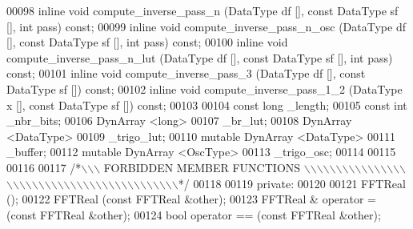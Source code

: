 \begin{DoxyCode}
00098     \textcolor{keyword}{inline} \textcolor{keywordtype}{void}     compute\_inverse\_pass\_n (DataType df [], \textcolor{keyword}{const} DataType sf [], \textcolor{keywordtype}{int} pass) \textcolor{keyword}{const};
00099     \textcolor{keyword}{inline} \textcolor{keywordtype}{void}     compute\_inverse\_pass\_n\_osc (DataType df [], \textcolor{keyword}{const} DataType sf [], \textcolor{keywordtype}{int} pass) \textcolor{keyword}{const};
00100     \textcolor{keyword}{inline} \textcolor{keywordtype}{void}     compute\_inverse\_pass\_n\_lut (DataType df [], \textcolor{keyword}{const} DataType sf [], \textcolor{keywordtype}{int} pass) \textcolor{keyword}{const};
00101     \textcolor{keyword}{inline} \textcolor{keywordtype}{void}     compute\_inverse\_pass\_3 (DataType df [], \textcolor{keyword}{const} DataType sf []) \textcolor{keyword}{const};
00102     \textcolor{keyword}{inline} \textcolor{keywordtype}{void}     compute\_inverse\_pass\_1\_2 (DataType x [], \textcolor{keyword}{const} DataType sf []) \textcolor{keyword}{const};
00103 
00104     \textcolor{keyword}{const} \textcolor{keywordtype}{long}      \_length;
00105     \textcolor{keyword}{const} \textcolor{keywordtype}{int}       \_nbr\_bits;
00106     DynArray <long>
00107                         \_br\_lut;
00108     DynArray <DataType>
00109                         \_trigo\_lut;
00110     \textcolor{keyword}{mutable} DynArray <DataType>
00111                         \_buffer;
00112    \textcolor{keyword}{mutable} DynArray <OscType>
00113                         \_trigo\_osc;
00114 
00115 
00116 
00117 \textcolor{comment}{/*\(\backslash\)\(\backslash\)\(\backslash\) FORBIDDEN MEMBER FUNCTIONS \(\backslash\)\(\backslash\)\(\backslash\)\(\backslash\)\(\backslash\)\(\backslash\)\(\backslash\)\(\backslash\)\(\backslash\)\(\backslash\)\(\backslash\)\(\backslash\)\(\backslash\)\(\backslash\)\(\backslash\)\(\backslash\)\(\backslash\)\(\backslash\)\(\backslash\)\(\backslash\)\(\backslash\)\(\backslash\)\(\backslash\)\(\backslash\)\(\backslash\)\(\backslash\)\(\backslash\)\(\backslash\)\(\backslash\)\(\backslash\)\(\backslash\)\(\backslash\)\(\backslash\)\(\backslash\)\(\backslash\)\(\backslash\)\(\backslash\)\(\backslash\)\(\backslash\)\(\backslash\)\(\backslash\)\(\backslash\)\(\backslash\)*/}
00118 
00119 \textcolor{keyword}{private}:
00120 
00121                         FFTReal ();
00122                         FFTReal (\textcolor{keyword}{const} FFTReal &other);
00123     FFTReal &       operator = (\textcolor{keyword}{const} FFTReal &other);
00124     \textcolor{keywordtype}{bool}                operator == (\textcolor{keyword}{const} FFTReal &other);

\end{DoxyCode}
